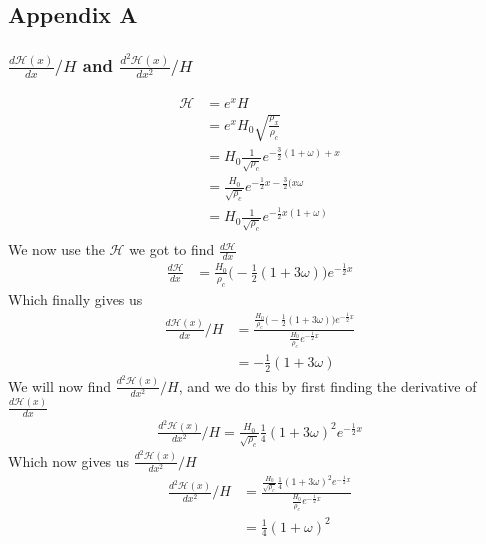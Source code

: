 \documentclass{aa}
\begin{document}
\subsection{Appendix A}
\label{A.1}
\subsubsection{$\frac{d\mathcal{H}(x)}{dx}/H$ and $\frac{d^2\mathcal{H}(x)}{dx^2}/H$}
\begin{align*}
    {\mathcal{H}}&=e^xH\\
    &=e^xH_0\sqrt{\frac{\rho_x}{\rho_c}}\\
    &=H_0\frac{1}{\sqrt{\rho_c}}e^{-\frac{3}{2}(1+\omega)+x}\\
    &=\frac{H_0}{\sqrt{\rho_c}}e^{-\frac{1}{2}x-\frac{3}{2}(x\omega}\\
    &=H_0\frac{1}{\sqrt{\rho_c}}e^{-\frac{1}{2}x(1+\omega)}\\
\end{align*}
We now use the $\mathcal{H}$ we got to find $\frac{d\mathcal{H}}{dx}$ 
\begin{align*}
    \frac{d\mathcal{H}}{dx}&=\frac{H_0}{\rho_c}\bigg(-\frac{1}{2}(1+3\omega)\bigg)e^{-\frac{1}{2}x}
\end{align*}
Which finally gives us 
\begin{align}
    {\frac{d\mathcal{H}(x)}{dx}/H}&=\frac{\frac{H_0}{\rho_c}\bigg(-\frac{1}{2}(1+3\omega)\bigg)e^{-\frac{1}{2}x}}{\frac{H_0}{\rho_c}e^{-\frac{1}{2}x}}\\
    &=-\frac{1}{2}(1+3\omega)
\end{align}
We will now find $\frac{d^2\mathcal{H}(x)}{dx^2}/H$, and we do this by first finding the derivative of $\frac{d\mathcal{H}(x)}{dx}$
\begin{align}
    \frac{d^2\mathcal{H}(x)}{dx^2}/H=\frac{H_0}{\sqrt{\rho_c}}\frac{1}{4}(1+3\omega)^2e^{-\frac{1}{2}x} 
\end{align}
Which now gives us $\frac{d^2\mathcal{H}(x)}{dx^2}/H$
\begin{align}
    \frac{d^2\mathcal{H}(x)}{dx^2}/H&=\frac{\frac{H_0}{\sqrt{\rho_c}}\frac{1}{4}(1+3\omega)^2e^{-\frac{1}{2}x} }{\frac{H_0}{\rho_c}e^{-\frac{1}{2}x}}\\
    &=\frac{1}{4}(1+\omega)^2
\end{align}
\clearpage
\end{document}
